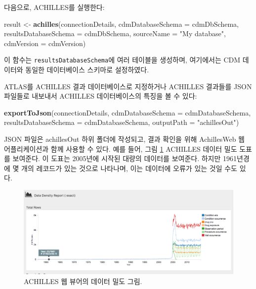 \documentclass[10.5pt]{book}
\newenvironment{Shaded}{\begin{snugshade}}{\end{snugshade}}
\newcommand{\KeywordTok}[1]{\textcolor[rgb]{0.13,0.29,0.53}{\textbf{#1}}}
\newcommand{\DataTypeTok}[1]{\textcolor[rgb]{0.13,0.29,0.53}{#1}}
\newcommand{\StringTok}[1]{\textcolor[rgb]{0.31,0.60,0.02}{#1}}
\newcommand{\NormalTok}[1]{#1}
\theoremstyle{definition}
\theoremstyle{definition}
\theoremstyle{definition}
\theoremstyle{remark}
\begin{document}
다음으로, ACHILLES를 실행한다:

\begin{Shaded}
\begin{Highlighting}[]
\NormalTok{result <-}\StringTok{ }\KeywordTok{achilles}\NormalTok{(connectionDetails,}
                   \DataTypeTok{cdmDatabaseSchema =}\NormalTok{ cdmDbSchema,}
                   \DataTypeTok{resultsDatabaseSchema =}\NormalTok{ cdmDbSchema,}
                   \DataTypeTok{sourceName =} \StringTok{"My database"}\NormalTok{,}
                   \DataTypeTok{cdmVersion =}\NormalTok{ cdmVersion)}
\end{Highlighting}
\end{Shaded}

이 함수는 \texttt{resultsDatabaseSchema}에 여러 테이블을 생성하며,
여기에서는 CDM 데이터와 동일한 데이터베이스 스키마로 설정하였다.

ATLAS를 ACHILLES 결과 데이터베이스로 지정하거나 ACHILLES 결과들를 JSON
파일들로 내보내서 ACHILLES 데이터베이스의 특징을 볼 수 있다:

\begin{Shaded}
\begin{Highlighting}[]
\KeywordTok{exportToJson}\NormalTok{(connectionDetails,}
             \DataTypeTok{cdmDatabaseSchema =}\NormalTok{ cdmDatabaseSchema,}
             \DataTypeTok{resultsDatabaseSchema =}\NormalTok{ cdmDatabaseSchema,}
             \DataTypeTok{outputPath =} \StringTok{"achillesOut"}\NormalTok{)}
\end{Highlighting}
\end{Shaded}

JSON 파일은 achillesOut 하위 폴더에 작성되고, 결과 확인을 위해
AchillesWeb 웹 어플리케이션과 함께 사용할 수 있다. 예를 들어, 그림
\ref{fig:achillesDataDensity} ACHILLES 데이터 밀도 도표를 보여준다. 이
도표는 2005년에 시작된 대량의 데이터를 보여준다. 하지만 1961년경에 몇
개의 레코드가 있는 것으로 나타나며, 이는 데이터에 오류가 있는 것일 수도
있다.

\begin{figure}

{\centering \includegraphics[width=1\linewidth]{images/DataQuality/achillesDataDensity} 

}

\caption{ACHILLES 웹 뷰어의 데이터 밀도 그림.}\label{fig:achillesDataDensity}
\end{figure}
\end{document}
